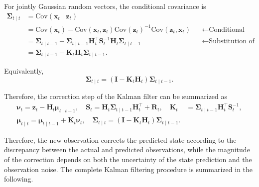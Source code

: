 \documentclass[../Bayesian_Inference.tex]{subfiles}
\begin{document}
For jointly Gaussian random vectors, the conditional covariance is
\[
\begin{aligned}
    \mathbf{\Sigma}_{t\mid t} &= \mathrm{Cov}(\bm{x}_t\mid\bm{z}_t) \\
    &= \mathrm{Cov}(\bm{x}_t)- \mathrm{Cov}(\bm{x}_t,\bm{z}_t)\mathrm{Cov}(\bm{z}_t)^{-1}\mathrm{Cov}(\bm{z}_t,\bm{x}_t)&&\leftarrow \text{Conditional Gaussian formula} \\
    &= \mathbf{\Sigma}_{t\mid t-1}- \mathbf{\Sigma}_{t\mid t-1}\mathbf{H}_t^\top\mathbf{S}_t^{-1}\mathbf{H}_t\mathbf{\Sigma}_{t\mid t-1}&&\leftarrow \text{Substitution of covariance terms} \\
    &= \mathbf{\Sigma}_{t\mid t-1}- \mathbf{K}_t\mathbf{H}_t\mathbf{\Sigma}_{t\mid t-1}.
\end{aligned}
\]

Equivalently,
\[
    \mathbf{\Sigma}_{t\mid t} = \left(\mathbf{I}-\mathbf{K}_t\mathbf{H}_t\right)
    \mathbf{\Sigma}_{t\mid t-1}.
\]

Therefore, the correction step of the Kalman filter can be summarized as
\[
\begin{aligned}
    \bm{\nu}_t = \bm{z}_t-\mathbf{H}_t\bm{\mu}_{t\mid t-1}, \quad \mathbf{S}_t = \mathbf{H}_t\mathbf{\Sigma}_{t\mid t-1}\mathbf{H}_t^\top+\mathbf{R}_t, \quad  \mathbf{K}_t&= \mathbf{\Sigma}_{t\mid t-1}\mathbf{H}_t^\top\mathbf{S}_t^{-1}, \\ 
    \bm{\mu}_{t\mid t} = \bm{\mu}_{t\mid t-1}+\mathbf{K}_t\bm{\nu}_t, \quad \mathbf{\Sigma}_{t\mid t} = \left(\mathbf{I}-\mathbf{K}_t\mathbf{H}_t\right)
    \mathbf{\Sigma}_{t\mid t-1}.
\end{aligned}
\]

Therefore, the new observation corrects the predicted state according to the discrepancy between the actual and predicted observations, while the magnitude of the correction depends on both the uncertainty of the state prediction and the observation noise. The complete Kalman filtering procedure is summarized in the following.
\end{document}
